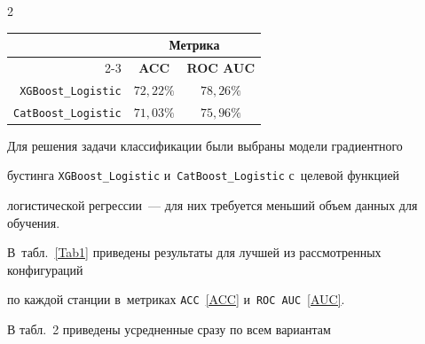 \begin{multicols}{2}



{\small

\begin{center}

\tabcolsep=13pt

\begin{tabular}{|r|c|c|}

\hline

& \multicolumn{2}{c|}{\bf Метрика}\\

\cline{2-3} %

\multicolumn{1}{|c|}{{\raisebox{6pt}[0pt][0pt]{{\bf Модель}}}} &

{\bf ACC}&   {\bf ROC AUC}\\

\hline

\verb"XGBoost_Logistic"  &  $72{,}22\%$ &  $78{,}26\%$ \\

\verb"CatBoost_Logistic" &  $71{,}03\%$ &  $75{,}96\%$ \\

\hline

\end{tabular}

\end{center}

}




\addtocounter{table}{1}



\vspace*{12pt}



Для решения задачи классификации были выбраны модели градиентного 

бустинга \verb"XGBoost_Logistic" и~\verb"CatBoost_Logistic" с~целевой функцией 

логистической регрессии~--- для них требуется меньший объем данных для обучения. 

В~табл.~\ref{Tab1} приведены результаты для лучшей из рассмотренных конфигураций 

по каждой станции в~метриках \verb"ACC"~\eqref{ACC} и~\verb"ROC AUC"~\eqref{AUC}. 



В табл.~2 приведены усредненные сразу по всем вариантам 


\end{multicols}
